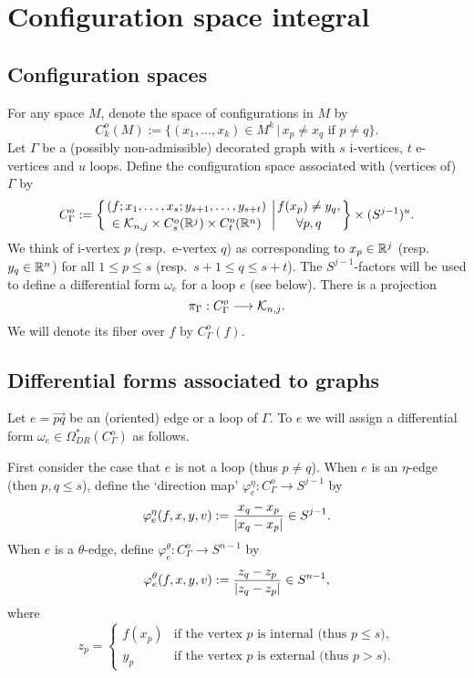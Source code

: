 \section{Configuration space integral}\label{sec_conf}


\subsection{Configuration spaces}\label{subsec_conf}


For any space $M$, denote the space of configurations in $M$ by
\[
 C^o_k (M) := \{ (x_1 ,\dots ,x_k )\in M^k \, |\, x_p \ne x_q \text{ if } p \ne q \} .
\]
Let $\Gamma$ be a (possibly non-admissible) decorated graph with $s$ i-vertices, $t$ e-vertices and $u$ loops.
Define the configuration space associated with (vertices of) $\Gamma$ by
\[
 C^o_{\Gamma} := \left\{
 \genfrac{}{}{0pt}{}
  {(f;x_1 ,\dots ,x_s ; y_{s+1} ,\dots ,y_{s+t})}{\in \emb{n}{j} \times C^o_s (\R^j ) \times C^o_t (\R^n )}
 \right. \left|
 \genfrac{}{}{0pt}{}{f(x_p ) \ne y_q ,}{\forall p,q}
 \right\}  \times (S^{j-1})^u .
\]
We think of i-vertex $p$ (resp.\ e-vertex $q$) as corresponding to $x_p \in \mathbb{R}^j$ (resp.~$y_q \in \mathbb{R}^n$)
for all $1 \le p \le s$ (resp.\ $s+1 \le q \le s+t$).
The $S^{j-1}$-factors will be used to define a differential form $\omega_e$ for a loop $e$ (see below).
There is a projection
\[
 \pi_{\Gamma} : C^o_{\Gamma} \longrightarrow \mathcal{K}_{n ,j}.
\]
We will denote its fiber over $f$ by $C^o_{\Gamma}(f)$.





\subsection{Differential forms associated to graphs}\label{subsection_form}
Let $e=\overrightarrow{pq}$ be an (oriented) edge or a loop of $\Gamma$.
To $e$ we will assign a differential form $\omega_e \in \Omega^*_{DR}(C^o_{\Gamma})$ as follows.


First consider the case that $e$ is not a loop (thus $p \ne q$).
When $e$ is an $\eta$-edge (then $p,q \le s$), define the `direction map' $\varphi^{\eta}_e : C^o_{\Gamma} \to S^{j-1}$
by
\[
 \varphi^{\eta}_e (f,x,y,v) := \frac{x_q -x_p}{\lvert {x_q -x_p} \rvert} \in S^{j-1}.
\]
When $e$ is a $\theta$-edge, define $\varphi^{\theta}_e : C^o_{\Gamma} \to S^{n-1}$ by
\[
 \varphi^{\theta}_e (f,x,y,v) := \frac{z_q -z_p}{\lvert {z_q -z_p} \rvert} \in S^{n-1},
\]
where
\[
 z_p =
 \begin{cases}
  f(x_p ) & \text{if the vertex $p$ is internal (thus $p \le s$)}, \\
  y_p     & \text{if the vertex $p$ is external (thus $p>s$)}.
 \end{cases}
\]


